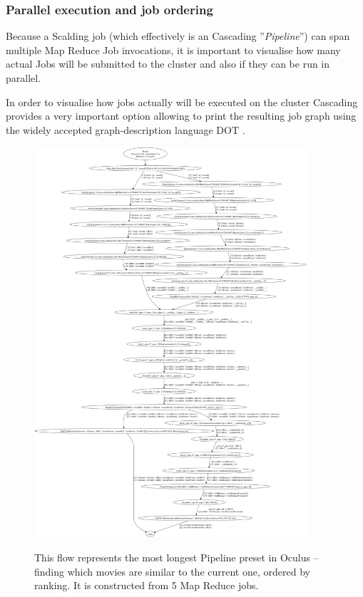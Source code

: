 \subsubsection{Parallel execution and job ordering}
Because a Scalding job (which effectively is an Cascading ''\textit{Pipeline}'') can span multiple Map Reduce Job invocations,
it is important to visualise how many actual Jobs will be submitted to the cluster and also if they can be run in parallel.

In order to visualise how jobs actually will be executed on the cluster Cascading provides a very important option allowing to print the resulting job
graph using the widely accepted graph-description language DOT \cite{dot}.

\begin{figure}[ch!]
  \centering
  \includegraphics[width=0.9\textwidth]{img/FindSimilarMoviesJob_dot.png}
  \label{fig:find-similar-movies-most-complicated}
  \caption{This flow represents the most longest Pipeline preset in Oculus -- finding which movies are similar to the current one, ordered by ranking. It is constructed from 5 Map Reduce jobs.}
\end{figure}

